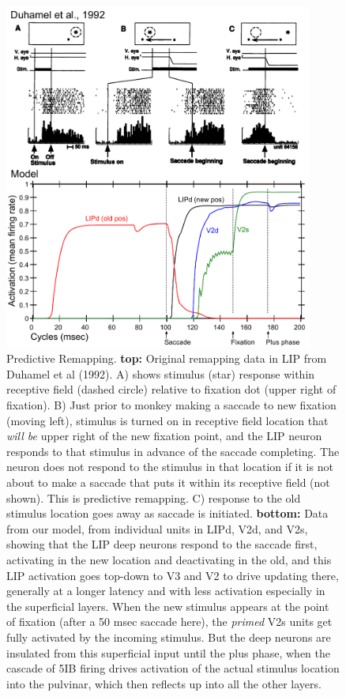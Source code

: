 \documentclass[11pt,twoside]{article}
\newif\myifpdf
\begin{document}
\begin{figure}
  \centering\includegraphics[width=4in]{fig_09} %
  \caption{Predictive Remapping.  {\bf top:} Original remapping data in LIP from Duhamel et al (1992).  A) shows stimulus (star) response within receptive field (dashed circle) relative to fixation dot (upper right of fixation).  B) Just prior to monkey making a saccade to new fixation (moving left), stimulus is turned on in receptive field location that {\em will be} upper right of the new fixation point, and the LIP neuron responds to that stimulus in advance of the saccade completing.  The neuron does not respond to the stimulus in that location if it is not about to make a saccade that puts it within its receptive field (not shown).  This is predictive remapping.  C) response to the old stimulus location goes away as saccade is initiated.  {\bf bottom:} Data from our model, from individual units in LIPd, V2d, and V2s, showing that the LIP deep neurons respond to the saccade first, activating in the new location and deactivating in the old, and this LIP activation goes top-down to V3 and V2 to drive updating there, generally at a longer latency and with less activation especially in the superficial layers.  When the new stimulus appears at the point of fixation (after a 50 msec saccade here), the {\em primed} V2s units get fully activated by the incoming stimulus.  But the deep neurons are insulated from this superficial input until the plus phase, when the cascade of 5IB firing drives activation of the actual stimulus location into the pulvinar, which then reflects up into all the other layers.}
  \label{fig.remap_units}
\end{figure}
\end{document}
